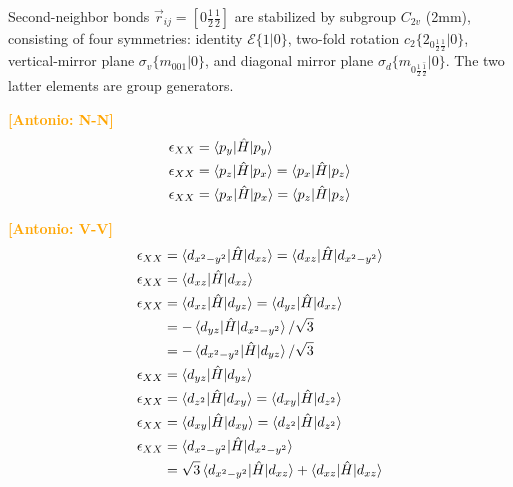 \documentclass[twocolumn,showpacs,preprintnumbers,superscriptaddress,prb,floatfix,aps,10pt]{revtex4-1}
\newcommand{\abmei}[1]{\textcolor{orange}{ \bf [Antonio: #1] }}
\newcommand*{\ham}{\hat{H}}
\newcommand*{\id}{\mathcal{E}}
\newcommand*{\bondvec}{\vec{r}_{ij}}
\newcommand{\seitz}[2]{\{#1|#2\}}
\begin{document}

Second-neighbor bonds $\bondvec = [0\frac{1}{2}\frac{1}{2}]$ are stabilized by subgroup $C_{2v}$ (2mm), consisting of four symmetries: identity $\id \seitz{1}{0}$, two-fold rotation $c_2 \seitz{ 2_{0\frac{1}{2}\frac{1}{2}} }{0}$, vertical-mirror plane $\sigma_v \seitz{m_{001}}{0}$, and diagonal mirror plane $\sigma_d \seitz{m_{0\frac{1}{2}\bar{\frac{1}{2}}}}{0}$. The two latter elements are group generators.

\abmei{N-N}
\begin{align}
\epsilon_{XX} &
= \braket{p_{y} | \ham | p_y } \\
\epsilon_{XX} &
= \braket{p_{z} | \ham | p_x }
= \braket{p_{x} | \ham | p_z } \\
\epsilon_{XX} &
= \braket{p_{x} | \ham | p_x }
= \braket{p_{z} | \ham | p_z } \\
\end{align}


\abmei{V-V}
\begin{align}
\epsilon_{XX} &
= \braket{d_{x^2-y^2} | \ham | d_{xz}}
= \braket{d_{xz} | \ham | d_{x^2-y^2}} \\
\epsilon_{XX} &
= \braket{d_{xz} | \ham | d_{xz}} \\
\epsilon_{XX} &
= \braket{d_{xz} | \ham | d_{yz}}
= \braket{d_{yz} | \ham | d_{xz}} \\
&
=-\braket{d_{yz} | \ham | d_{x^2-y^2}}/\sqrt{3} \\
&
=-\braket{d_{x^2-y^2} | \ham | d_{yz}}/\sqrt{3} \\
\epsilon_{XX} &
= \braket{d_{yz} | \ham | d_{yz}} \\
\epsilon_{XX} &
= \braket{d_{z^2}| \ham | d_{xy}}
= \braket{d_{xy} | \ham | d_{z^2}} \\
\epsilon_{XX} &
= \braket{d_{xy}  | \ham | d_{xy}}
= \braket{d_{z^2} | \ham | d_{z^2}} \\
\epsilon_{XX} &
= \braket{d_{x^2-y^2} | \ham | d_{x^2-y^2}} \\
&
= \sqrt{3} \braket{d_{x^2-y^2} | \ham | d_{xz}} 
         + \braket{d_{xz}      | \ham | d_{xz}} \\
\end{align}
\end{document}
